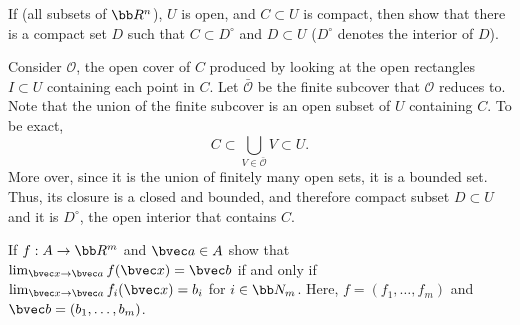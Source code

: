 \documentclass[12pt, letterpaper]{hmcpset}
\begin{document}
\pagebreak

\begin{problem}[22]
	If (all subsets of $\bb R^n$), $U$ is open, and $C \subset U$ is compact, then show that there is a compact set $D$ such that $C \subset D^\circ$ and $D \subset U$ ($D^\circ$ denotes the interior of $D$).
\end{problem}

\begin{solution}
	Consider $\mathcal O$, the open cover of $C$ produced by looking at the open rectangles $I \subset U$ containing each point in $C$. Let $\bar{\mathcal O}$ be the finite subcover that $\mathcal O$ reduces to. Note that the union of the finite subcover is an open subset of $U$ containing $C$. To be exact,
	\[
		C \subset \bigcup_{V \in \bar{\mathcal O}} V \subset U.
	\]
	More over, since it is the union of finitely many open sets, it is a bounded set. Thus, its closure is a closed and bounded, and therefore compact subset $D \subset U$ and it is $D^\circ$, the open interior that contains $C$.
\end{solution}

\pagebreak

\begin{problem}[23]
	If $f : A \to \bb R^m$ and $\bvec a \in A$ show that $\lim_{\bvec x \to \bvec a} f(\bvec x) = \bvec b$ if and only if $\lim_{\bvec x \to \bvec a} f_i(\bvec x) = b_i$ for $i \in \bb N_m$. Here, $f = (f_1, \ldots, f_m)$ and $\bvec b = (b_1, \ldots, b_m)$.
\end{problem}
\end{document}
